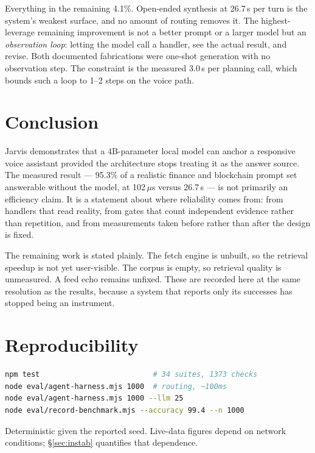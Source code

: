 \documentclass[10pt,twocolumn]{article}
\begin{document}
Everything in the remaining 4.1\%. Open-ended synthesis at 26.7\,s per turn is the
system's weakest surface, and no amount of routing removes it. The highest-leverage
remaining improvement is not a better prompt or a larger model but an
\emph{observation loop}: letting the model call a handler, see the actual result, and
revise. Both documented fabrications were one-shot generation with no observation step.
The constraint is the measured 3.0\,s per planning call, which bounds such a loop to 1--2
steps on the voice path.

\section{Conclusion}

Jarvis demonstrates that a 4B-parameter local model can anchor a responsive voice
assistant provided the architecture stops treating it as the answer source. The measured
result --- 95.3\% of a realistic finance and blockchain prompt set answerable without the
model, at 102\,$\mu$s versus 26.7\,s --- is not primarily an efficiency claim. It is a
statement about where reliability comes from: from handlers that read reality, from gates
that count independent evidence rather than repetition, and from measurements taken
before rather than after the design is fixed.

The remaining work is stated plainly. The fetch engine is unbuilt, so the retrieval
speedup is not yet user-visible. The corpus is empty, so retrieval quality is unmeasured.
A feed echo remains unfixed. These are recorded here at the same resolution as the
results, because a system that reports only its successes has stopped being an instrument.

\section*{Reproducibility}

\begin{lstlisting}[language=bash]
npm test                          # 34 suites, 1373 checks
node eval/agent-harness.mjs 1000  # routing, ~100ms
node eval/agent-harness.mjs 1000 --llm 25
node eval/record-benchmark.mjs --accuracy 99.4 --n 1000
\end{lstlisting}

Deterministic given the reported seed. Live-data figures depend on network conditions;
\S\ref{sec:instab} quantifies that dependence.
\end{document}
